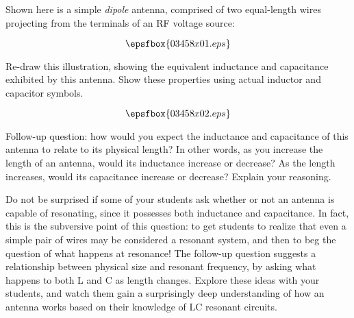 

Shown here is a simple {\it dipole} antenna, comprised of two equal-length wires projecting from the terminals of an RF voltage source:

$$\epsfbox{03458x01.eps}$$

Re-draw this illustration, showing the equivalent inductance and capacitance exhibited by this antenna.  Show these properties using actual inductor and capacitor symbols.







$$\epsfbox{03458x02.eps}$$

\vskip 10pt

Follow-up question: how would you expect the inductance and capacitance of this antenna to relate to its physical length?  In other words, as you increase the length of an antenna, would its inductance increase or decrease?  As the length increases, would its capacitance increase or decrease?  Explain your reasoning.







Do not be surprised if some of your students ask whether or not an antenna is capable of resonating, since it possesses both inductance and capacitance.  In fact, this is the subversive point of this question: to get students to realize that even a simple pair of wires may be considered a resonant system, and then to beg the question of what happens at resonance!  The follow-up question suggests a relationship between physical size and resonant frequency, by asking what happens to both L and C as length changes.  Explore these ideas with your students, and watch them gain a surprisingly deep understanding of how an antenna works based on their knowledge of LC resonant circuits.




